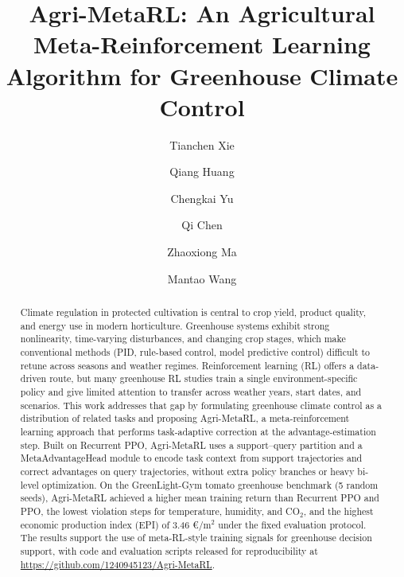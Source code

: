 \documentclass[number,preprint,review,12pt]{elsarticle}
\begin{document}
\begin{frontmatter}

\title{Agri-MetaRL: An Agricultural Meta-Reinforcement Learning Algorithm for Greenhouse Climate Control}

\author[inst1]{Tianchen Xie\footnotemark[1]}

\author[inst1]{Qiang Huang\footnotemark[1]}

\author[inst1]{Chengkai Yu}

\author[inst1]{Qi Chen}

\author[inst1]{Zhaoxiong Ma}

\author[inst1]{Mantao Wang}



\begin{abstract}
Climate regulation in protected cultivation is central to crop yield, product quality, and energy use in modern horticulture. Greenhouse systems exhibit strong nonlinearity, time-varying disturbances, and changing crop stages, which make conventional methods (PID, rule-based control, model predictive control) difficult to retune across seasons and weather regimes. Reinforcement learning (RL) offers a data-driven route, but many greenhouse RL studies train a single environment-specific policy and give limited attention to transfer across weather years, start dates, and scenarios. This work addresses that gap by formulating greenhouse climate control as a distribution of related tasks and proposing Agri-MetaRL, a meta-reinforcement learning approach that performs task-adaptive correction at the advantage-estimation step. Built on Recurrent PPO, Agri-MetaRL uses a support--query partition and a MetaAdvantageHead module to encode task context from support trajectories and correct advantages on query trajectories, without extra policy branches or heavy bi-level optimization. On the GreenLight-Gym tomato greenhouse benchmark (5 random seeds), Agri-MetaRL achieved a higher mean training return than Recurrent PPO and PPO, the lowest violation steps for temperature, humidity, and CO$_2$, and the highest economic production index (EPI) of 3.46 €/m$^2$ under the fixed evaluation protocol. The results support the use of meta-RL-style training signals for greenhouse decision support, with code and evaluation scripts released for reproducibility at \url{https://github.com/1240945123/Agri-MetaRL}.
\end{abstract}


\end{frontmatter}
\end{document}
